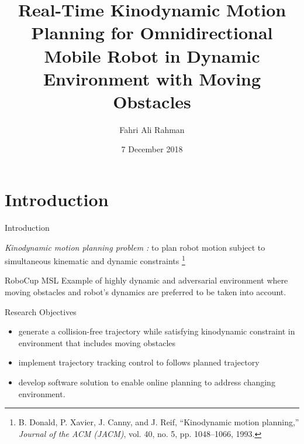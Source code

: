 \documentclass{beamer}
\title[Report]{Real-Time Kinodynamic Motion Planning for Omnidirectional Mobile Robot in Dynamic Environment with Moving Obstacles}
\author{Fahri Ali Rahman}
\institute{Department of Electrical Engineering and Information Technology}
\date{7 December 2018}
\begin{document}
\begin{frame}
  \titlepage
\end{frame}


\section{Introduction}

\begin{frame}{Introduction}

\begin{block}{\emph{Kinodynamic motion planning problem :}}
to plan robot motion subject to simultaneous kinematic and dynamic constraints 
\footnote{B. Donald, P. Xavier, J. Canny, and J. Reif, “Kinodynamic motion planning,” \emph{Journal of the ACM (JACM)}, vol. 40, no. 5, pp. 1048–1066, 1993.}
\end{block}

\vskip 1cm

\begin{block}{RoboCup MSL}
Example of highly dynamic and adversarial environment where moving obstacles and robot's dynamics are preferred to be taken into account.
\end{block}

\end{frame}

\begin{frame}{Research Objectives}
\begin{itemize}
\item generate a collision-free trajectory while satisfying kinodynamic constraint in environment that includes moving obstacles
\item implement trajectory tracking control to follows planned trajectory
\item develop software solution to enable online planning to address changing environment.
\end{itemize}
\end{frame}
\end{document}
